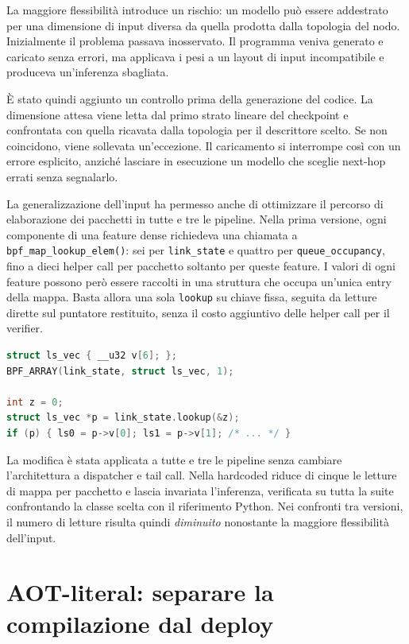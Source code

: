 \documentclass[binding=0.6cm,italian,oneside,noexaminfo]{sapthesis}
\begin{document}
La maggiore flessibilità introduce un rischio: un modello può essere addestrato per una dimensione di input diversa da quella prodotta dalla topologia del nodo. Inizialmente il problema passava inosservato. Il programma veniva generato e caricato senza errori, ma applicava i pesi a un layout di input incompatibile e produceva un'inferenza sbagliata.

È stato quindi aggiunto un controllo prima della generazione del codice. La dimensione attesa viene letta dal primo strato lineare del checkpoint e confrontata con quella ricavata dalla topologia per il descrittore scelto. Se non coincidono, viene sollevata un'eccezione. Il caricamento si interrompe così con un errore esplicito, anziché lasciare in esecuzione un modello che sceglie next-hop errati senza segnalarlo.

La generalizzazione dell'input ha permesso anche di ottimizzare il percorso di elaborazione dei pacchetti in tutte e tre le pipeline. Nella prima versione, ogni componente di una feature dense richiedeva una chiamata a \texttt{bpf\_map\_lookup\_elem()}: sei per \texttt{link\_state} e quattro per \texttt{queue\_occupancy}, fino a dieci helper call per pacchetto soltanto per queste feature. I valori di ogni feature possono però essere raccolti in una struttura che occupa un'unica entry della mappa. Basta allora una sola \texttt{lookup} su chiave fissa, seguita da letture dirette sul puntatore restituito, senza il costo aggiuntivo delle helper call per il verifier.

\newpage
\begin{lstlisting}[language=C,caption={Da N lookup a 1: mappa struct-valued}]
struct ls_vec { __u32 v[6]; };
BPF_ARRAY(link_state, struct ls_vec, 1);

int z = 0;
struct ls_vec *p = link_state.lookup(&z);
if (p) { ls0 = p->v[0]; ls1 = p->v[1]; /* ... */ }
\end{lstlisting}

La modifica è stata applicata a tutte e tre le pipeline senza cambiare l'architettura a dispatcher e tail call. Nella hardcoded riduce di cinque le letture di mappa per pacchetto e lascia invariata l'inferenza, verificata su tutta la suite confrontando la classe scelta con il riferimento Python. Nei confronti tra versioni, il numero di letture risulta quindi \emph{diminuito} nonostante la maggiore flessibilità dell'input.

\section{AOT-literal: separare la compilazione dal deploy}
\label{sec:aot}
\end{document}

